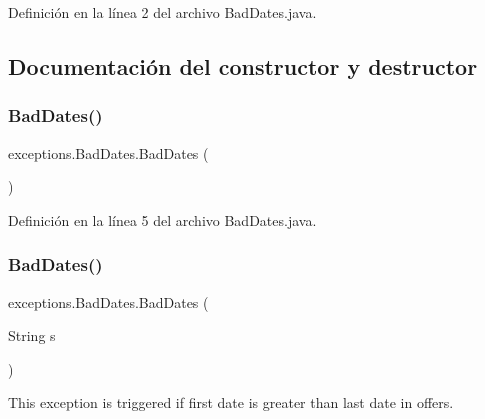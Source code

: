 Definición en la línea 2 del archivo Bad\+Dates.\+java.



\subsection{Documentación del constructor y destructor}
\mbox{\label{classexceptions_1_1_bad_dates_ad4918ff10b5e46df93774ea9087e6d04}} 
\subsubsection{\texorpdfstring{BadDates()}{BadDates()}\hspace{0.1cm}{\footnotesize\ttfamily [1/2]}}
{\footnotesize\ttfamily exceptions.\+Bad\+Dates.\+Bad\+Dates (\begin{DoxyParamCaption}{ }\end{DoxyParamCaption})}



Definición en la línea 5 del archivo Bad\+Dates.\+java.


\begin{DoxyCode}{0}

\end{DoxyCode}
\mbox{\label{classexceptions_1_1_bad_dates_a34213c984892e85612e3a2e44220e896}} 
\subsubsection{\texorpdfstring{BadDates()}{BadDates()}\hspace{0.1cm}{\footnotesize\ttfamily [2/2]}}
{\footnotesize\ttfamily exceptions.\+Bad\+Dates.\+Bad\+Dates (\begin{DoxyParamCaption}\item[{String}]{s }\end{DoxyParamCaption})}



This exception is triggered if first date is greater than last date in offers. 


